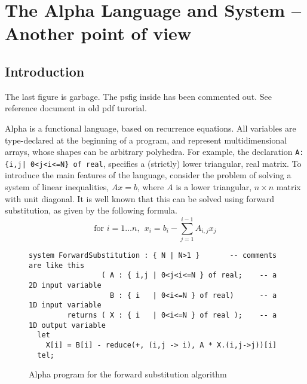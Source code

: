 \chapter{The Alpha Language and System -- Another point of view}
\label{chapfunctional}
\section{Introduction}

\begin{tobedone}
The last figure is garbage. The psfig inside has been commented out. 
See reference document in old pdf turorial.
\end{tobedone}
Alpha is a functional language, based on recurrence
equations.  All variables are type-declared
at the beginning of a program, and represent multidimensional arrays,
whose shapes can be arbitrary polyhedra.  For example, the declaration
\verb!A: {i,j| 0<j<i<=N} of real!, specifies a (strictly) lower
triangular, real matrix.  To
introduce the main features of the language, consider the problem of
solving a system of linear inequalities, $Ax=b$, where $A$ is a lower
triangular, $n\times n$ matrix with unit diagonal.  It is well known
that this can be solved using forward substitution, as given by the following formula.  \[\mbox{for } i =
1\ldots n,~~x_i = b_i - \sum_{j=1}^{i-1} A_{i,j} x_j\]

\begin{figure}[tb]
\setlength{\unitlength}{10mm}
\begin{center}
\begin{verbatim}
system ForwardSubstitution : { N | N>1 }       -- comments are like this
                 ( A : { i,j | 0<j<i<=N } of real;    -- a 2D input variable
                   B : { i   | 0<i<=N } of real)      -- a 1D input variable
         returns ( X : { i   | 0<i<=N } of real );    -- a 1D output variable
  let
    X[i] = B[i] - reduce(+, (i,j -> i), A * X.(i,j->j))[i]
  tel;
\end{verbatim}
\end{center}
\caption{Alpha program for the forward substitution algorithm}
\label{fig-fs}
\end{figure}

